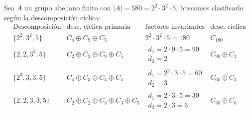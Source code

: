 \begin{ejemplo}
    Sea $A$ un grupo abeliano finito con $|A| = 580 = 2^2\cdot 3^2\cdot 5$, buscamos clasificarlo según la descomposición cíclica:
    \begin{equation*}
        \begin{array}{c|c|c|c}
            \text{Descomposición} & \text{desc. cíclica primaria} & \text{factores invariantes} & \text{desc. cíclica} \\
            \hline
            \{2^2, 3^2, 5\} & C_4\oplus C_9 \oplus C_5 & 2^2\cdot 3^2\cdot 5 = 180 & C_{180} \\
            \hline
            \{2,2,3^2,5\} & C_2\oplus C_2\oplus C_9\oplus C_5 & \begin{array}{c}
                    d_1 = 2\cdot 9\cdot 5 = 90 \\
                    d_2 = 2
            \end{array}& C_{90}\oplus C_2 \\
            \hline
            \{2^3, 3, 3, 5\} & C_4\oplus C_3\oplus C_3\oplus C_5 & \begin{array}{c}
                    d_1 = 2^2\cdot 3\cdot 5 = 60 \\
                    d_2 = 3
            \end{array}& C_{60} \oplus C_3 \\
            \hline
                    \{2,2,3,3,5\} & C_2\oplus C_2\oplus C_3\oplus C_3\oplus C_5 & \begin{array}{c}
                            d_1 = 2\cdot 3\cdot 5 = 30 \\
                            d_2 = 2\cdot 3 = 6
                        \end{array} & C_{30} \oplus C_6
        \end{array}
    \end{equation*}
\end{ejemplo}

